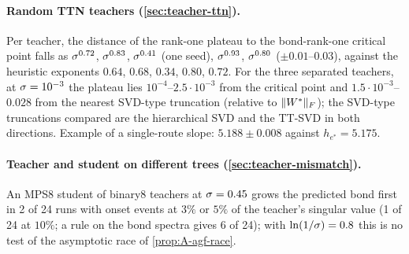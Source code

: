 \paragraph{Random TTN teachers (\cref{sec:teacher-ttn}).}
\empirical{} Per teacher, the distance of the rank-one plateau to the bond-rank-one critical point falls as
$\sigma^{0.72}$, $\sigma^{0.83}$, $\sigma^{0.41}$ (one seed), $\sigma^{0.93}$, $\sigma^{0.80}$ ($\pm0.01$--$0.03$), against the heuristic exponents
$0.64$, $0.68$, $0.34$, $0.80$, $0.72$. For the three separated teachers, at $\sigma=10^{-3}$ the plateau lies
$10^{-4}$--$2.5\cdot10^{-3}$ from the critical point and $1.5\cdot10^{-3}$--$0.028$ from the nearest SVD-type truncation
(relative to $\lVert W^{*}\rVert_{F}$); the SVD-type truncations compared are the hierarchical SVD and the TT-SVD in both
directions. Example of a single-route slope: $5.188\pm0.008$ against $h_{e^*}=5.175$.

\paragraph{Teacher and student on different trees (\cref{sec:teacher-mismatch}).}
\empirical{} An MPS8 student of binary8 teachers at $\sigma=0.45$ grows the predicted bond first in 2 of 24
runs with onset events at $3\%$ or $5\%$ of the teacher's singular value (1 of 24 at $10\%$; a rule on the
bond spectra gives 6 of 24); with $\ln(1/\sigma)=0.8$ this is no test of the asymptotic race of
\cref{prop:A-agf-race}.


